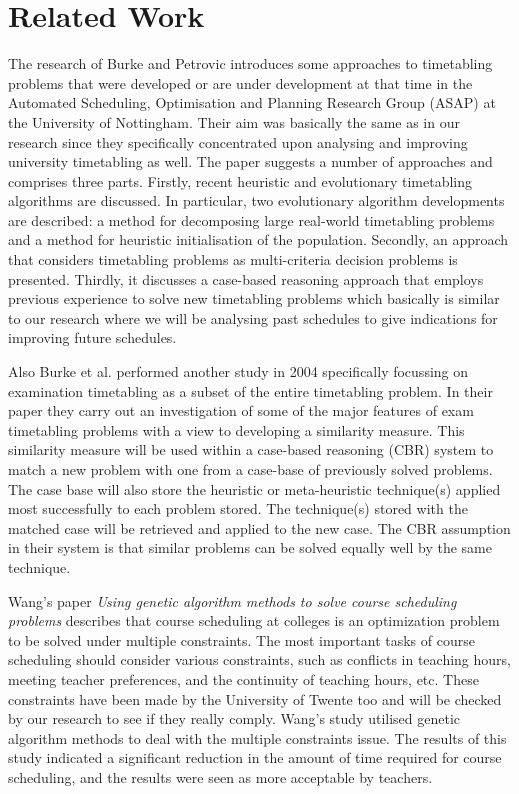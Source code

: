 \section{Related Work}
The research of Burke and Petrovic \cite{recentResearchDirectionsInAutomatedTimetabling} introduces some approaches to timetabling problems that were developed or are under development at that time in the Automated Scheduling, Optimisation and Planning Research Group (ASAP) at the University of Nottingham. Their aim was basically the same as in our research since they specifically concentrated upon analysing and improving university timetabling as well. The paper suggests a number of approaches and comprises three parts. Firstly, recent heuristic and evolutionary timetabling algorithms are discussed. In particular, two evolutionary algorithm developments are described: a method for decomposing large real-world timetabling problems and a method for heuristic initialisation of the population. Secondly, an approach that considers timetabling problems as multi-criteria decision problems is presented. Thirdly, it discusses a case-based reasoning approach that employs previous experience to solve new timetabling problems which basically is similar to our research where we will be analysing past schedules to give indications for improving future schedules.

Also Burke et al. performed another study in 2004 \cite{burke2004analysing} specifically focussing on examination timetabling as a subset of the entire timetabling problem. In their paper they carry out an investigation of some of the major features of exam timetabling problems with a view to developing
a similarity measure. This similarity measure will be used within a case-based reasoning (CBR) system to match a new problem with one from a case-base of previously solved problems. The case base will also store the heuristic or meta-heuristic technique(s) applied most successfully to each problem stored. The technique(s) stored with the matched case will be retrieved and applied to the new case. The CBR assumption in their system is that similar problems can be solved equally well by the same technique.

Wang's paper \textit{Using genetic algorithm methods to solve course scheduling problems} \cite{usingGeneticAlgorithmMethodsToSolveScheduling} describes that course scheduling at colleges is an optimization problem to be solved under multiple constraints. The most important tasks of course scheduling should consider various constraints, such as conflicts in teaching hours, meeting teacher preferences, and the continuity of teaching hours, etc. These constraints have been made by the University of Twente too and will be checked by our research to see if they really comply. Wang's study utilised genetic algorithm methods to deal with the multiple constraints issue. The results of this study indicated a significant reduction in the amount of time required for course scheduling, and the results were seen as more acceptable by teachers.

